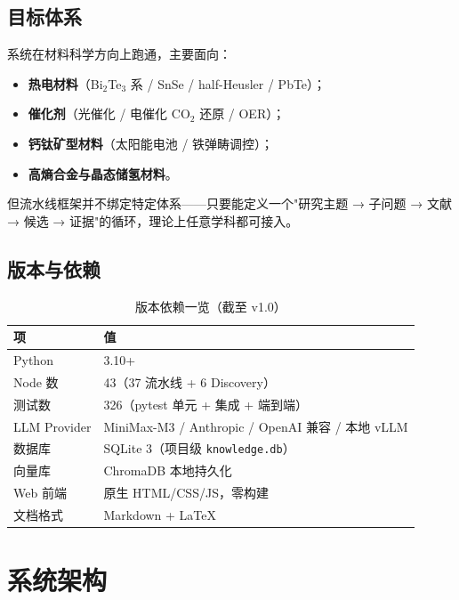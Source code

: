 \documentclass[11pt,a4paper]{article}
\begin{document}
\subsection{目标体系}

系统在材料科学方向上跑通，主要面向：
\begin{itemize}[leftmargin=2em]
\item \textbf{热电材料}（Bi$_2$Te$_3$ 系 / SnSe / half-Heusler / PbTe）；
\item \textbf{催化剂}（光催化 / 电催化 CO$_2$ 还原 / OER）；
\item \textbf{钙钛矿型材料}（太阳能电池 / 铁弹畴调控）；
\item \textbf{高熵合金与晶态储氢材料}。
\end{itemize}

但流水线框架并不绑定特定体系——只要能定义一个"研究主题 → 子问题 → 文献 → 候选 → 证据"的循环，理论上任意学科都可接入。

\subsection{版本与依赖}

\begin{table}[h]
\centering
\caption{版本依赖一览（截至 v1.0）}
\begin{tabular}{@{}ll@{}}
\toprule
\textbf{项} & \textbf{值} \\
\midrule
Python & 3.10+ \\
Node 数 & 43（37 流水线 + 6 Discovery） \\
测试数 & 326（pytest 单元 + 集成 + 端到端）\\
LLM Provider & MiniMax-M3 / Anthropic / OpenAI 兼容 / 本地 vLLM \\
数据库 & SQLite 3（项目级 \texttt{knowledge.db}）\\
向量库 & ChromaDB 本地持久化 \\
Web 前端 & 原生 HTML/CSS/JS，零构建 \\
文档格式 & Markdown + LaTeX \\
\bottomrule
\end{tabular}
\end{table}

\section{系统架构}
\end{document}

